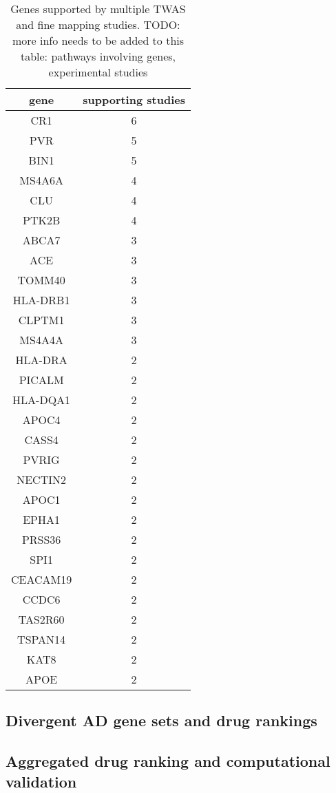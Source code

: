\documentclass[letterpaper]{article}
\begin{document}
\begin{table}
  \footnotesize
\begin{tabular}{cc}
  gene       & supporting studies \\
  \hline
  CR1        & 6\\
  PVR        & 5\\
  BIN1       & 5\\
  MS4A6A     & 4\\
  CLU        & 4\\
  PTK2B      & 4\\
  ABCA7      & 3\\
  ACE        & 3\\
  TOMM40     & 3\\
  HLA-DRB1   & 3\\
  CLPTM1     & 3\\
  MS4A4A     & 3\\
  HLA-DRA    & 2\\
  PICALM     & 2\\
  HLA-DQA1   & 2\\
  APOC4      & 2\\
  CASS4      & 2\\
  PVRIG      & 2\\
  NECTIN2    & 2\\
  APOC1      & 2\\
  EPHA1      & 2\\
  PRSS36     & 2\\
  SPI1       & 2\\
  CEACAM19   & 2\\
  CCDC6      & 2\\
  TAS2R60    & 2\\
  TSPAN14    & 2\\
  KAT8       & 2\\
  APOE       & 2\\
\end{tabular}
\caption{
Genes supported by multiple TWAS and fine mapping studies.  TODO: more info
needs to be added to this table: pathways involving genes, experimental
studies
}
\label{tab:twas-genes}
\end{table}

\subsection{Divergent AD gene sets and drug rankings}

\subsection{Aggregated drug ranking and computational validation}
\end{document}
